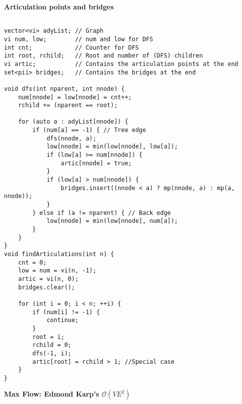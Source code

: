 \documentclass[a4paper,10pt]{article}
\newcommand{\titleAlg}[1]{\vspace{-10pt}
\begin{center}\textbf{#1}\end{center} \vspace{-10pt}}
\begin{document}
\titleAlg{Articulation points and bridges}
\begin{multicols}{2}

\begin{verbatim}

vector<vi> adyList; // Graph
vi num, low;        // num and low for DFS
int cnt;            // Counter for DFS
int root, rchild;   // Root and number of (DFS) children
vi artic;           // Contains the articulation points at the end
set<pii> bridges;   // Contains the bridges at the end

void dfs(int nparent, int nnode) {
    num[nnode] = low[nnode] = cnt++;
    rchild += (nparent == root);

    for (auto a : adyList[nnode]) {
        if (num[a] == -1) { // Tree edge
            dfs(nnode, a);
            low[nnode] = min(low[nnode], low[a]);
            if (low[a] >= num[nnode]) {
                artic[nnode] = true;
            }
            if (low[a] > num[nnode]) {
                bridges.insert((nnode < a) ? mp(nnode, a) : mp(a, nnode));
            }
        } else if (a != nparent) { // Back edge
            low[nnode] = min(low[nnode], num[a]);
        }
    }
}
void findArticulations(int n) {
    cnt = 0;
    low = num = vi(n, -1);
    artic = vi(n, 0);
    bridges.clear();

    for (int i = 0; i < n; ++i) {
        if (num[i] != -1) {
            continue;
        }
        root = i;
        rchild = 0;
        dfs(-1, i);
        artic[root] = rchild > 1; //Special case
    }
}
\end{verbatim}
\end{multicols}
\titleAlg{Max Flow: Edmond Karp's $\mathcal{O}(VE^2)$}
\end{document}
